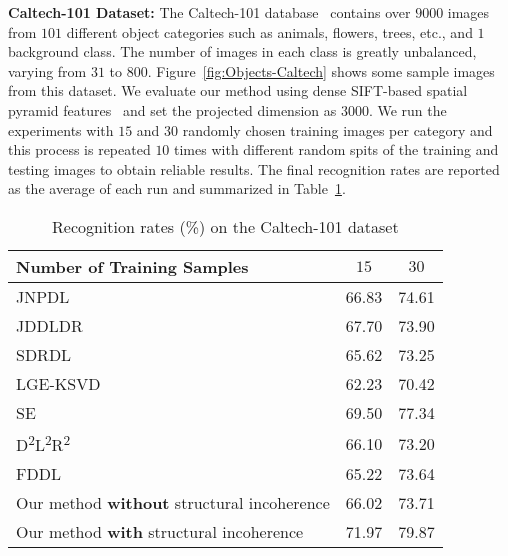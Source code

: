 \documentclass[journal]{IEEEtran}
\newcommand\Tstrut{\rule{0pt}{2.6ex}}         %
\newcommand\Bstrut{\rule[-0.9ex]{0pt}{0pt}}   %
\begin{document}
\vspace{1em}
\textbf{Caltech-101 Dataset:} The Caltech-101 database~\cite{Caltech} contains over $9000$ images from $101$ different object categories such as animals, flowers, trees, etc., and $1$ background class. The number of images in each class is greatly unbalanced, varying from $31$ to $800$. Figure~\ref{fig:Objects-Caltech} shows some sample images from this dataset. We evaluate our method using dense SIFT-based spatial pyramid features~\cite{LC-KSVD} and set the projected dimension as $3000$. We run the experiments with $15$ and $30$ randomly chosen training images per category and this process is repeated $10$ times with different random spits of the training and testing images to obtain reliable results. The final recognition rates are reported as the average of each run and summarized in Table~\ref{table:Caltech}.
\begin{table}[b]
\caption{Recognition rates (\%) on the Caltech-101 dataset}
\label{table:Caltech}
\centering
\begin{tabular}{|l|c|c|}
\hline
Number of Training Samples & $15$ & $30$ \Tstrut\Bstrut\\
\hline \hline 
JNPDL~\cite{JNPDL}       & 66.83 & 74.61 \Tstrut\Bstrut\\
JDDLDR~\cite{JDDRDL}     & 67.70 & 73.90 \Tstrut\Bstrut\\
SDRDL~\cite{Simul-DL}    & 65.62 & 73.25 \Tstrut\Bstrut\\
LGE-KSVD~\cite{LGE-KSVD} & 62.23 & 70.42 \Tstrut\Bstrut\\
SE~\cite{SE}             & 69.50 & 77.34 \Tstrut\Bstrut\\
D\textsuperscript{2}L\textsuperscript{2}R\textsuperscript{2}~\cite{D2L2R2} & 66.10 & 73.20 \Tstrut\Bstrut\\
FDDL~\cite{FDDL}         & 65.22 & 73.64 \Tstrut\Bstrut\\
Our method \textbf{without} structural incoherence & 66.02 & 73.71 \Tstrut\Bstrut\\
Our method \textbf{with} structural incoherence    & 71.97 & 79.87 \Tstrut\Bstrut\\
\hline
\end{tabular}
\end{table}
\end{document}
